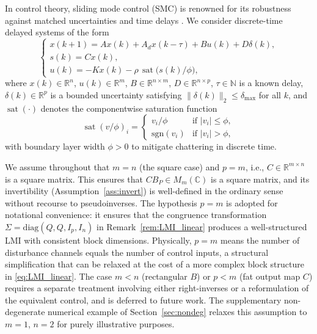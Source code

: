 \documentclass[10pt]{amsart}
\DeclareMathOperator{\sat}{sat}
\numberwithin{equation}{section}
\begin{document}
In control theory, sliding mode control (SMC) is renowned for its robustness against
matched uncertainties and time delays \cite{Utkin1992, Edwards1998}. We consider
discrete-time delayed systems of the form
\begin{equation}\label{eq:system}
\begin{cases}
  x(k+1) = A x(k) + A_d x(k - \tau) + B u(k) + D \delta(k), \\
  s(k) = C x(k), \\
  u(k) = -K x(k) - \rho \, \sat\bigl(s(k)/\phi\bigr),
\end{cases}
\end{equation}
where \(x(k)\in\mathbb{R}^n\), \(u(k)\in\mathbb{R}^m\), $B \in \mathbb{R}^{n \times m}$,
$D \in \mathbb{R}^{n \times p}$, \(\tau\in\mathbb{N}\) is a known delay,
\(\delta(k)\in\mathbb{R}^p\) is a bounded uncertainty satisfying
\(\|\delta(k)\|_2 \leq \delta_{\max}\) for all $k$, and \(\sat(\cdot)\) denotes the
componentwise saturation function
\[
  \sat(v/\phi)_i = \begin{cases} v_i/\phi & \text{if } |v_i| \leq \phi, \\
  \mathrm{sgn}(v_i) & \text{if } |v_i| > \phi, \end{cases}
\]
with boundary layer width \(\phi>0\) to mitigate chattering in discrete time.

We assume throughout that \(m = n\) (the square case) and \(p = m\), i.e.,
$C \in \mathbb{R}^{m \times n}$ is a square matrix. This ensures that
$CB_P \in M_m(\mathbb{C})$ is a square matrix, and its invertibility
(Assumption~\ref{ass:invert}) is well-defined in the ordinary sense without recourse to
pseudoinverses. The hypothesis $p = m$ is adopted for notational convenience: it ensures
that the congruence transformation $\Sigma = \mathrm{diag}(Q, Q, I_p, I_n)$ in
Remark~\ref{rem:LMI_linear} produces a well-structured LMI with consistent block
dimensions. Physically, $p = m$ means the number of disturbance channels equals the
number of control inputs, a structural simplification that can be relaxed at the cost of
a more complex block structure in \eqref{eq:LMI_linear}. The case \(m < n\) (rectangular
\(B\)) or \(p < m\) (fat output map \(C\)) requires a separate treatment involving either
right-inverses or a reformulation of the equivalent control, and is deferred to future
work. The supplementary non-degenerate numerical example of Section~\ref{sec:nondeg}
relaxes this assumption to $m=1$, $n=2$ for purely illustrative purposes.
\end{document}
